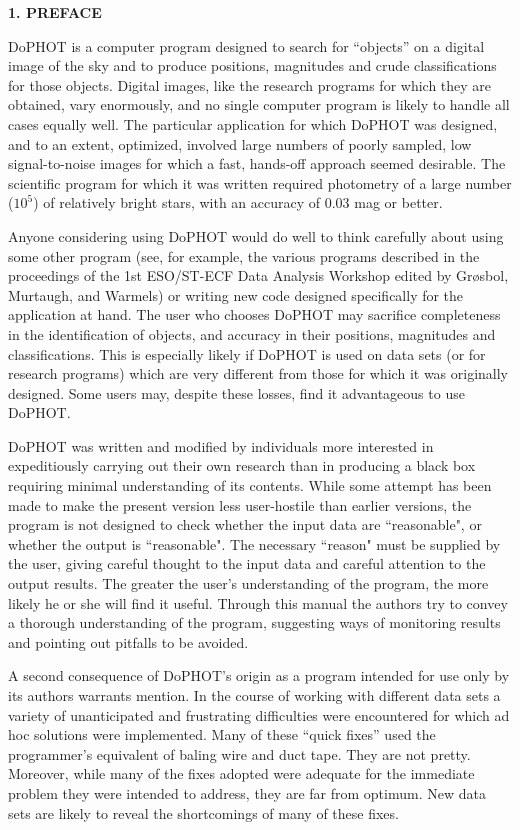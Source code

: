 \centerline{\bf 1. PREFACE}

DoPHOT is a computer program designed to search for
``objects'' on a digital image of the sky and to produce
positions, magnitudes and crude classifications for those
objects.  Digital images, like the research programs for
which they are obtained, vary enormously, and no single
computer program is likely to handle all cases equally well.
The particular application for which DoPHOT was designed,
and to an extent, optimized, involved large numbers of
poorly sampled, low signal-to-noise images for which a fast,
hands-off approach seemed desirable.  The scientific program
for which it was written required photometry of a large
number ($10^5$) of relatively bright stars, with an accuracy
of 0.03 mag or better.

Anyone considering using DoPHOT would do well to think
carefully about using some other program (see, for example, the
various programs described in the proceedings of the 1st ESO/ST-ECF
Data Analysis Workshop edited by Gr\o sbol, Murtaugh, and Warmels)
or writing new code designed
specifically for the application at hand.  The user who
chooses DoPHOT may sacrifice completeness in the
identification of objects, and accuracy in their positions,
magnitudes and classifications.  This is especially likely
if DoPHOT is used on data sets (or for research programs)
which are very different from those for which it was
originally designed.  Some users may, despite these losses,
find it advantageous to use DoPHOT.

DoPHOT was written and modified by individuals more
interested in expeditiously carrying out their own research
than in producing a black box requiring minimal
understanding of its contents.  While some attempt has been
made to make the present version less user-hostile than
earlier versions, the program is not designed to check
whether the input data are ``reasonable", or whether the
output is ``reasonable".  The necessary ``reason" must be
supplied by the user, giving careful thought to the input
data and careful attention to the output results.  The
greater the user's understanding of the program, the more
likely he or she will find it useful.  Through this manual
the authors try to convey a thorough understanding of the
program, suggesting ways of monitoring results and pointing
out pitfalls to be avoided.

A second consequence of DoPHOT's origin as a program
intended for use only by its authors warrants mention.  In
the course of working with different data sets a variety of
unanticipated and frustrating difficulties were encountered
for which ad hoc solutions were implemented.  Many of these
``quick fixes'' used the programmer's equivalent of baling
wire and duct tape.  They are not pretty.  Moreover, while
many of the fixes adopted were adequate for the immediate
problem they were intended to address, they are far from
optimum.  New data sets are likely to reveal the
shortcomings of many of these fixes.

